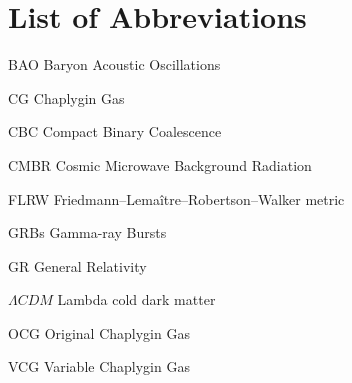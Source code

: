 
\chapter*{List of Abbreviations}
               
\begin{acronym}\itemsep-20pt\parsep-20pt %
\item[BAO]  Baryon Acoustic Oscillations
\item[CG] Chaplygin Gas
\item[CBC] Compact Binary Coalescence
\item[CMBR] Cosmic Microwave Background Radiation
\item[FLRW] Friedmann–Lemaître–Robertson–Walker metric
\item[GRBs] Gamma-ray Bursts
\item[GR]   General Relativity 
\item[$ΛCDM$] Lambda cold dark matter
\item[OCG] Original Chaplygin Gas
\item[VCG] Variable Chaplygin Gas
\end{acronym}